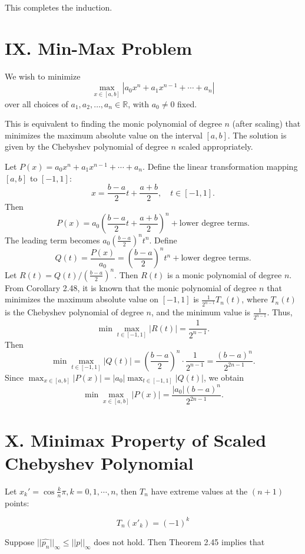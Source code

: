 \documentclass[a4paper]{article}
\begin{document}
This completes the induction.  

\section*{IX. Min-Max Problem}

We wish to minimize
\[
\max_{x \in [a, b]} \left| a_0 x^n + a_1 x^{n-1} + \cdots + a_n \right|
\]
over all choices of \( a_1, a_2, \ldots, a_n \in \mathbb{R} \), with \( a_0 \neq 0 \) fixed.

This is equivalent to finding the monic polynomial of degree \( n \) (after scaling) that minimizes the maximum absolute value on the interval \([a, b]\). The solution is given by the Chebyshev polynomial of degree \( n \) scaled appropriately.

Let \( P(x) = a_0 x^n + a_1 x^{n-1} + \cdots + a_n \). Define the linear transformation mapping \([a, b]\) to \([-1, 1]\):
\[
x = \frac{b - a}{2} t + \frac{a + b}{2}, \quad t \in [-1, 1].
\]
Then
\[
P(x) = a_0 \left( \frac{b - a}{2} t + \frac{a + b}{2} \right)^n + \text{lower degree terms}.
\]
The leading term becomes \( a_0 \left( \frac{b - a}{2} \right)^n t^n \). Define
\[
Q(t) = \frac{P(x)}{a_0} = \left( \frac{b - a}{2} \right)^n t^n + \text{lower degree terms}.
\]
Let \( R(t) = Q(t) / \left( \frac{b - a}{2} \right)^n \). Then \( R(t) \) is a monic polynomial of degree \( n \). From Corollary 2.48, it is known that the monic polynomial of degree \( n \) that minimizes the maximum absolute value on \([-1, 1]\) is \( \frac{1}{2^{n-1}} T_n(t) \), where \( T_n(t) \) is the Chebyshev polynomial of degree \( n \), and the minimum value is \( \frac{1}{2^{n-1}} \). Thus,
\[
\min \max_{t \in [-1, 1]} |R(t)| = \frac{1}{2^{n-1}}.
\]
Then
\[
\min \max_{t \in [-1, 1]} |Q(t)| = \left( \frac{b - a}{2} \right)^n \cdot \frac{1}{2^{n-1}} = \frac{(b - a)^n}{2^{2n - 1}}.
\]
Since \( \max_{x \in [a, b]} |P(x)| = |a_0| \max_{t \in [-1, 1]} |Q(t)| \), we obtain
\[
\min \max_{x \in [a, b]} |P(x)| = \frac{|a_0|(b - a)^n}{2^{2n - 1}}.
\]

\section*{X. Minimax Property of Scaled Chebyshev Polynomial}

Let $x_k' = \cos{\frac{k}{n}\pi}, k = 0, 1, \cdots, n$, then $T_n$ have extreme values at the $(n+1)$ points:

$$T_n(x'_k) = (-1)^k$$

Suppose $||\hat{p_n}||_\infty \le ||p||_\infty$ does not hold. Then Theorem 2.45 implies that
\end{document}
